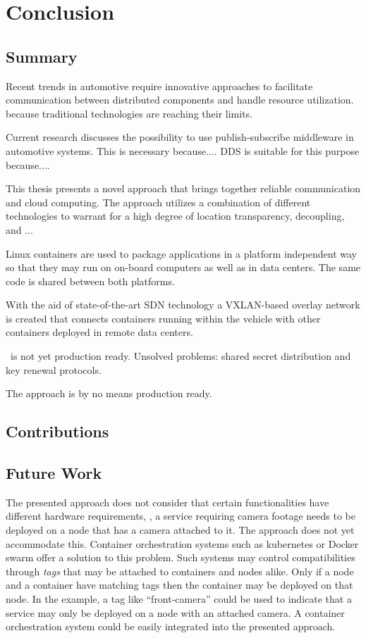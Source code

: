
\chapter{Conclusion}\label{chapter:conclusion}

\section{Summary}

Recent trends in automotive require innovative approaches to facilitate communication between distributed components and handle resource utilization. because traditional technologies are reaching their limits. 

Current research discusses the possibility to use publish-subscribe middleware in automotive systems. This is necessary because.... DDS is suitable for this purpose because.... 

This thesis presents a novel approach that brings together reliable communication and cloud computing. The approach utilizes a combination of different technologies to warrant for a high degree of location transparency, decoupling,  and ...

Linux containers are used to package applications in a platform independent way so that they may run on on-board computers as well as in data centers. The same code is shared between both platforms.

With the aid of state-of-the-art SDN technology a VXLAN-based overlay network is created that connects containers running within the vehicle with other containers deployed in remote data centers. 


\wnet\ is not yet production ready. Unsolved problems: shared secret distribution and key renewal protocols.

The approach is by no means production ready.

\section{Contributions}


\section{Future Work}

The presented approach does not consider that certain functionalities have different hardware requirements, \ie , a service requiring camera footage needs to be deployed on a node that has a camera attached to it. The approach does not yet accommodate this. Container orchestration systems such as kubernetes or Docker swarm offer a solution to this problem. Such systems may control compatibilities through \emph{tags} that may be attached to containers and nodes alike. Only if a node and a container have matching tags then the container may be deployed on that node. In the example, a tag like ``front-camera'' could be used to indicate that a service may only be deployed on a node with an attached camera. A container orchestration system could be easily integrated into the presented approach. 


